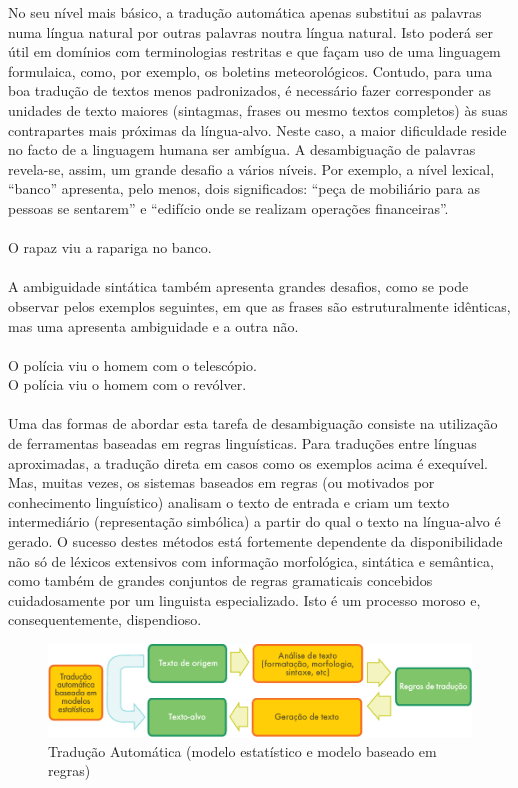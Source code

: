 \begin{multicols}{2}
No seu nível mais básico, a tradução automática apenas substitui as palavras numa língua natural por outras palavras noutra língua natural. Isto poderá ser útil em domínios com terminologias restritas e que façam uso de uma linguagem formulaica, como, por exemplo, os boletins meteorológicos. Contudo, para uma boa tradução de textos menos padronizados, é necessário fazer corresponder as unidades de texto maiores (sintagmas, frases ou mesmo textos completos) às suas contrapartes mais próximas da língua-alvo. Neste caso, a maior dificuldade reside no facto de a linguagem humana ser ambígua. A desambiguação de palavras revela-se, assim, um grande desafio a vários níveis. Por exemplo, a nível lexical, “banco” apresenta, pelo menos, dois significados: “peça de mobiliário para as pessoas se sentarem” e “edifício onde se realizam operações financeiras”.\\
\\
O rapaz viu a rapariga no banco. \\
\\
A ambiguidade sintática também apresenta grandes desafios, como se pode observar pelos exemplos seguintes, em que as frases são estruturalmente idênticas, mas uma apresenta ambiguidade e a outra não.\\
\\
O polícia viu o homem com o telescópio.\\
O polícia viu o homem com o revólver.\\
\\
Uma das formas de abordar esta tarefa de desambiguação consiste na utilização de ferramentas baseadas em regras linguísticas. Para traduções entre línguas aproximadas, a tradução direta em casos como os exemplos acima é exequível. Mas, muitas vezes, os sistemas baseados em regras (ou motivados por conhecimento linguístico) analisam o texto de entrada e criam um texto intermediário (representação simbólica) a partir do qual o texto na língua-alvo é gerado. O sucesso destes métodos está fortemente dependente da disponibilidade não só de lé\-xi\-cos extensivos com informação morfológica, sintática e semântica, como também de grandes conjuntos de regras gramaticais concebidos cuidadosamente por um linguista especializado. Isto é um processo moroso e, consequentemente, dispendioso.

\begin{figure}[htb]
  \center
  \includegraphics[width=\textwidth]{../_media/portuguese/machine_translation}
  \caption{Tradução Automática (modelo estatístico e modelo baseado em regras)}
  \label{fig:mtarch_de}
\end{figure}


\end{multicols}

